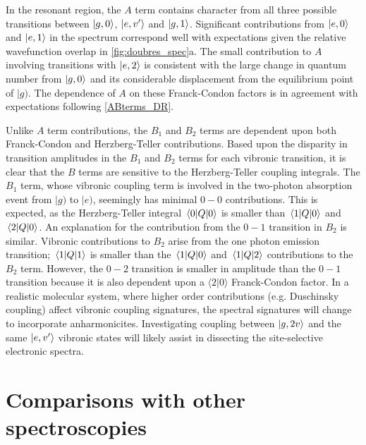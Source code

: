\documentclass[aip, jcp, reprint, onecolumn]{revtex4-2}
\begin{document}
In the resonant region, the $A$ term contains character from all three possible transitions between $\ket{g,0}$, $\ket{e,v'}$ and $\ket{g,1}$. 
Significant contributions from $\ket{e,0}$ and $\ket{e,1}$ in the spectrum correspond well with expectations given the relative wavefunction overlap in \autoref{fig:doubres_spec}a. 
The small contribution to $A$ involving transitions with $\ket{e,2}$ is consistent with the large change in quantum number from $\ket{g,0}$ and its considerable displacement from the equilibrium point of $|g)$.
The dependence of $A$ on these Franck-Condon factors is in agreement with expectations following \autoref{ABterms_DR}. 

Unlike $A$ term contributions, the $B_1$ and $B_2$ terms are dependent upon both Franck-Condon and Herzberg-Teller contributions.
Based upon the disparity in transition amplitudes in the $B_1$ and $B_2$ terms for each vibronic transition, it is clear that the $B$ terms are sensitive to the Herzberg-Teller coupling integrals.
The $B_1$ term, whose vibronic coupling term is involved in the two-photon absorption event from $|g)$ to $|e)$, seemingly has minimal $0-0$ contributions. 
This is expected, as the Herzberg-Teller integral $\mel{0}{Q}{0}$ is smaller than $\mel{1}{Q}{0}$ and $\mel{2}{Q}{0}$. 
An explanation for the contribution from the $0-1$ transition in $B_2$ is similar.
Vibronic contributions to $B_2$ arise from the one photon emission transition; $\mel{1}{Q}{1}$ is smaller than the $\mel{1}{Q}{0}$ and $\mel{1}{Q}{2}$ contributions to the $B_2$ term.
However, the $0-2$ transition is smaller in amplitude than the $0-1$ transition because it is also dependent upon a $\langle 2 | 0 \rangle$ Franck-Condon factor.
In a realistic molecular system, where higher order contributions (e.g. Duschinsky coupling) affect vibronic coupling signatures, the spectral signatures will change to incorporate anharmonicites. \cite{Duschinsky1937, Carlson1990, Kundu2022}
Investigating coupling between $\ket{g,2v}$ and the same $\ket{e,v'}$ vibronic states will likely assist in dissecting the site-selective electronic spectra.

\section{Comparisons with other spectroscopies}\label{quant}
\end{document}
